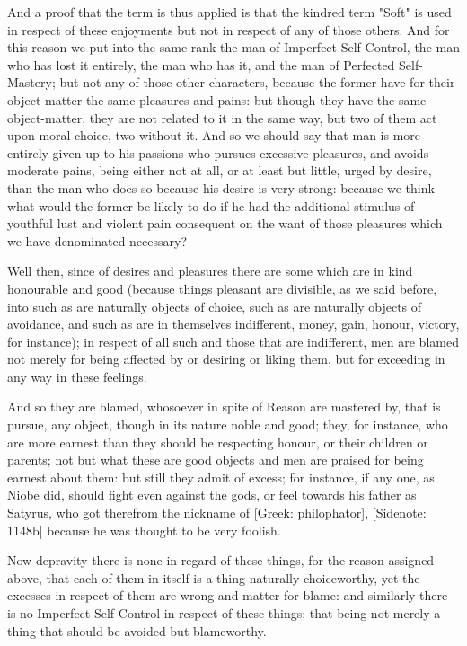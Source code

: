 And a proof that the term is thus applied is that the kindred term
"Soft" is used in respect of these enjoyments but not in respect of any
of those others. And for this reason we put into the same rank the man
of Imperfect Self-Control, the man who has lost it entirely, the man
who has it, and the man of Perfected Self-Mastery; but not any of those
other characters, because the former have for their object-matter the
same pleasures and pains: but though they have the same object-matter,
they are not related to it in the same way, but two of them act upon
moral choice, two without it. And so we should say that man is more
entirely given up to his passions who pursues excessive pleasures, and
avoids moderate pains, being either not at all, or at least but little,
urged by desire, than the man who does so because his desire is very
strong: because we think what would the former be likely to do if he had
the additional stimulus of youthful lust and violent pain consequent on
the want of those pleasures which we have denominated necessary?

Well then, since of desires and pleasures there are some which are in
kind honourable and good (because things pleasant are divisible, as we
said before, into such as are naturally objects of choice, such as
are naturally objects of avoidance, and such as are in themselves
indifferent, money, gain, honour, victory, for instance); in respect of
all such and those that are indifferent, men are blamed not merely for
being affected by or desiring or liking them, but for exceeding in any
way in these feelings.

And so they are blamed, whosoever in spite of Reason are mastered by,
that is pursue, any object, though in its nature noble and good; they,
for instance, who are more earnest than they should be respecting
honour, or their children or parents; not but what these are good
objects and men are praised for being earnest about them: but still they
admit of excess; for instance, if any one, as Niobe did, should fight
even against the gods, or feel towards his father as Satyrus, who got
therefrom the nickname of [Greek: philophator], [Sidenote: 1148b]
because he was thought to be very foolish.

Now depravity there is none in regard of these things, for the reason
assigned above, that each of them in itself is a thing naturally
choiceworthy, yet the excesses in respect of them are wrong and matter
for blame: and similarly there is no Imperfect Self-Control in respect
of these things; that being not merely a thing that should be avoided
but blameworthy.

